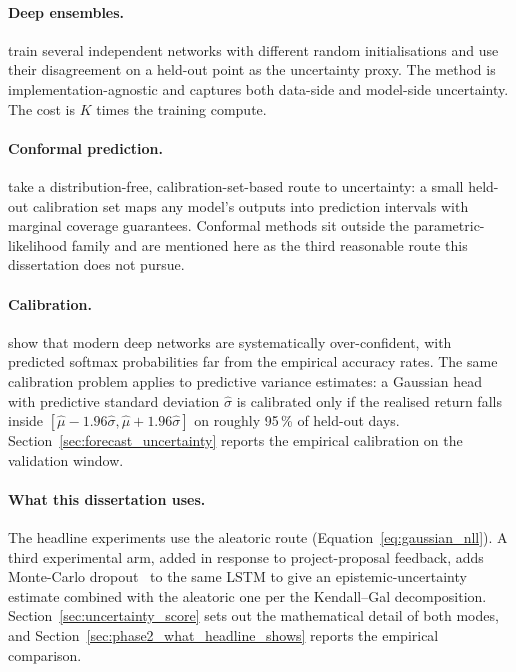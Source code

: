 \paragraph{Deep ensembles.} \textcite{lakshminarayanan2017simple} train several independent networks with different random initialisations and use their disagreement on a held-out point as the uncertainty proxy. The method is implementation-agnostic and captures both data-side and model-side uncertainty. The cost is $K$ times the training compute.

\paragraph{Conformal prediction.} \textcite{vovk2005algorithmic} take a distribution-free, calibration-set-based route to uncertainty: a small held-out calibration set maps any model's outputs into prediction intervals with marginal coverage guarantees. Conformal methods sit outside the parametric-likelihood family and are mentioned here as the third reasonable route this dissertation does not pursue.

\paragraph{Calibration.} \textcite{guo2017calibration} show that modern deep networks are systematically over-confident, with predicted softmax probabilities far from the empirical accuracy rates. The same calibration problem applies to predictive variance estimates: a Gaussian head with predictive standard deviation $\hat\sigma$ is calibrated only if the realised return falls inside $[\hat\mu - 1.96\hat\sigma, \hat\mu + 1.96\hat\sigma]$ on roughly 95\,\% of held-out days. Section~\ref{sec:forecast_uncertainty} reports the empirical calibration on the validation window.

\paragraph{What this dissertation uses.} The headline experiments use the aleatoric route (Equation~\ref{eq:gaussian_nll}). A third experimental arm, added in response to project-proposal feedback, adds Monte-Carlo dropout~\parencite{gal2016dropout} to the same LSTM to give an epistemic-uncertainty estimate combined with the aleatoric one per the Kendall--Gal decomposition. Section~\ref{sec:uncertainty_score} sets out the mathematical detail of both modes, and Section~\ref{sec:phase2_what_headline_shows} reports the empirical comparison.

